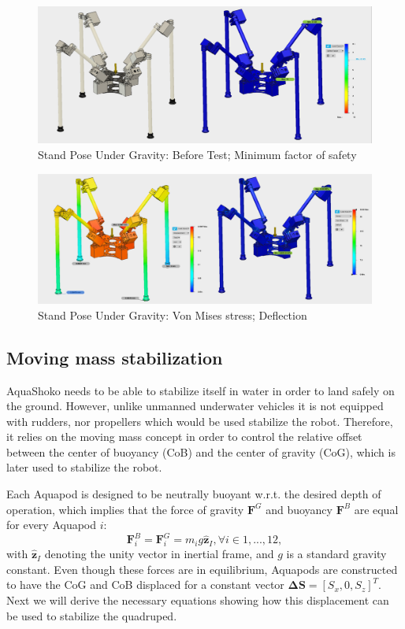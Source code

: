  
\begin{figure}[h]
\centering
\includegraphics[width=1.0\columnwidth]{./img/aquaShoko-v3dot3-FEA-Standing-1.png}
\caption{Stand Pose Under Gravity: Before Test; Minimum factor of safety }
\label{fig:test two pressure check}
\end{figure}

\begin{figure}[h]
\centering
\includegraphics[width=1.0\columnwidth]{./img/aquaShoko-v3dot3-FEA-Standing-2.png}
\caption{Stand Pose Under Gravity: Von Mises stress; Deflection}
\label{fig:test two pressure check}
\end{figure}

\subsection{Moving mass stabilization}
AquaShoko needs to be able to stabilize itself in water in order to land safely on the ground. However, unlike unmanned underwater vehicles it is not equipped with rudders, nor propellers which would be used stabilize the robot. Therefore, it relies on the moving mass concept in order to control the relative offset between the center of buoyancy (CoB) and the center of gravity (CoG), which is later used to stabilize the robot.

Each Aquapod is designed to be neutrally buoyant w.r.t. the desired depth of operation, which implies that the force of gravity $\textbf{F}^G$ and buoyancy $\textbf{F}^B$ are equal for every Aquapod $i$:
\begin{equation}\label{eq:equilibrium}
\textbf{F}^B_i=\textbf{F}^G_i=m_i g \hat{\textbf{z}}_I, \forall i \in 1,...,12,
\end{equation}
with $\hat{\textbf{z}}_I$ denoting the unity vector in inertial frame, and $g$ is a standard gravity constant. Even though these forces are in equilibrium, Aquapods are constructed to have the CoG and CoB displaced for a constant vector $\boldsymbol{\Delta}\textbf{S}=[S_x, 0, S_z]^T$. Next we will derive the necessary equations showing how this displacement can be used to stabilize the quadruped.

